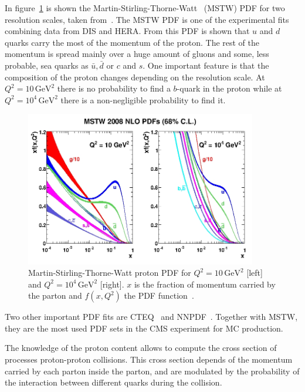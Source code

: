 In figure~\ref{fig:MSTW} is shown the Martin-Stirling-Thorne-Watt~\cite{Martin:2009iq} (MSTW) PDF for two resolution scales, taken from~\cite{Martin:2009iq}. The MSTW PDF is one of the experimental fits combining data from DIS and HERA. From this PDF is shown that $u$ and $d$ quarks carry the most of the momentum of the proton. The rest of the momentum is spread mainly over a huge amount of gluons and some, less probable, sea quarks as $\bar{u}, \bar{d}$ or $c$ and $s$. One important feature is that the composition of the proton changes depending on the resolution scale. At $Q^{2}= 10\, \text{GeV}^{2}$ there is no probability to find a $b$-quark in the proton while at $Q^{2}= 10^{4}\, \text{GeV}^{2}$ there is a non-negligible probability to find it.

\begin{figure}[!Hhtbp]
  \begin{center}
    \includegraphics[width=0.9\textwidth]{figs/mstw2008nlo68cl_allpdfs.jpg}
    \caption{Martin-Stirling-Thorne-Watt proton PDF for $Q^{2}= 10\, \text{GeV}^{2}$ [left] and $Q^{2}= 10^{4}\, \text{GeV}^{2}$ [right]. $x$ is the fraction of momentum carried by the parton and $f(x,Q^{2})$ the PDF function~\cite{Martin:2009iq}.}
    \label{fig:MSTW}
  \end{center}
\end{figure}

Two other important PDF fits are CTEQ~\cite{Nadolsky:2008zw} and NNPDF~\cite{Ball:2010de}. Together with MSTW, they are the most used PDF sets in the CMS experiment for MC production. 

The knowledge of the proton content allows to compute the cross section of processes proton-proton collisions. This cross section depends of the momentum carried by each parton inside the parton, and are modulated by the probability of the interaction between different quarks during the collision.

